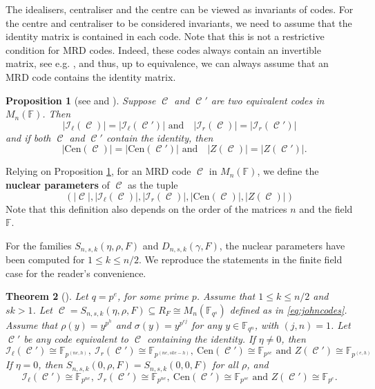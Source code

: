 \documentclass[a4paper, 11pt]{article}
\DeclareMathOperator{\C}{\mathcal{C}}
\newtheorem{theorem}{Theorem}[section]
\newtheorem{proposition}[theorem]{Proposition}
\newcommand{\fqn}{\mathbb{F}_{q^n}}
\newcommand{\F}{{\mathbb F}}
\newcommand{\lid}{\mathcal{I}_{\ell}}
\newcommand{\rid}{\mathcal{I}_{r}}
\newcommand{\cen}{\mathrm{Cen}}
\begin{document}
The idealisers, centraliser and the centre can be viewed as invariants of codes. For the centre and centraliser to be considered invariants, we need to assume that the identity matrix is contained in each code. Note that this is not a restrictive condition for MRD codes. Indeed, these codes always contain an invertible matrix, see e.g. \cite[Lemma 2.1]{lunardon2018nuclei}, and thus, up to equivalence, we can always assume that an MRD code contains the identity matrix.



\begin{proposition} [see \textnormal{\cite{lunardon2018nuclei} and \cite[Proposition 4]{sheekey2020new}}]
\label{prop:idequiv}
Suppose $\C$ and $\C'$ are two equivalent codes in $M_n(\F)$. Then
\[
|\lid(\C)| = |\lid(\C')| \mbox{ and}\quad |\rid(\C)| = |\rid(\C')|\]
and if both $\C$ and $\C'$ contain the identity, then
\[
\quad |\cen(\C)| = |\cen(\C')| \mbox{ and} \quad |Z(\C)| = |Z(\C')|.
\]
\end{proposition}

Relying on Proposition \ref{prop:idequiv}, for an MRD code $\C$ in $M_n(\F)$, we define the \textbf{nuclear parameters} of $\C$ as the tuple
\[
(\lvert \C \rvert, \lvert \lid(\C) \rvert,\lvert \rid(\C) \rvert,\lvert \cen(\C) \rvert,\lvert Z(\C) \rvert)
\]
Note that this definition also depends on the order of the matrices $n$ and the field $\F$.

For the families $S_{n,s,k}(\eta,\rho,F)$ and $D_{n,s,k}(\gamma,F)$, the nuclear parameters have been computed for $1 \leq k \leq n/2$. We reproduce the statements in the finite field case for the reader's convenience.

\begin{theorem} [\textnormal{\cite[Theorem 9]{sheekey2020new}}] \label{th:parconstrsheekey}
Let $q=p^e$, for some prime $p$. Assume that $1 \leq k \leq n/2$ and $sk>1$. Let $\C=S_{n,s,k}(\eta,\rho,F) \subseteq R_F \cong M_n(\F_{q^s})$ defined as in \eqref{eq:johncodes}. Assume that $\rho(y)=y^{p^h}$ and $\sigma(y)=y^{p^{ej}}$ for any $y \in \fqn$, with $(j,n)=1$. Let $\C'$ be any code equivalent to $\C$ containing the identity. If $\eta \neq 0$, then 
\[
\lid(\C') \cong \F_{p^{(ne,h)}}, \ \rid(\C') \cong  \F_{p^{(ne,ske-h)}}, \ \cen(\C')  \cong  \F_{p^{se}} \mbox{ and } Z(\C') \cong  \F_{p^{(e,h)}}
\]
If $\eta = 0$, then $S_{n,s,k}(0,\rho,F)=S_{n,s,k}(0,0,F)$ for all $\rho$, and 
\[
\lid(\C') \cong \F_{p^{ne}}, \ \rid(\C')  \cong  \F_{p^{ne}}, \ \cen(\C')  \cong  \F_{p^{se}}\mbox{ and } Z(\C') \cong  \F_{p^e}.
\]
\end{theorem}
\end{document}
